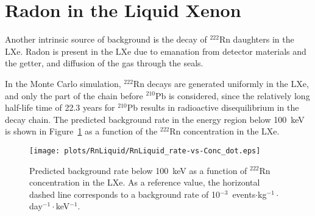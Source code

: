 \section{Radon in the Liquid Xenon}

Another intrinsic source of background is the decay of $^{222}$Rn daughters in the LXe. Radon is present in the LXe due to emanation from detector materials and the getter, and diffusion of the gas  through the seals. 

In the Monte Carlo simulation, $^{222}$Rn decays are generated uniformly in the LXe, and only the part of the chain before $^{210}$Pb is considered, since the relatively long half-life time of 22.3 years for $^{210}$Pb results in radioactive disequilibrium in the decay chain.
The predicted background rate in the energy region below 100~keV is shown in Figure~\ref{figLXeRn} as a function of the $^{222}$Rn concentration in the LXe.

\begin{figure}[!t]
\texttt{[image: plots/RnLiquid/RnLiquid\_rate-vs-Conc\_dot.eps]}
\caption[Predicted background rate below 100~keV as a function of $^{222}$Rn concentration in the LXe]{Predicted background rate below 100~keV as a function of $^{222}$Rn concentration in the LXe. As a reference value, the horizontal dashed line corresponds to a background rate of 10$^{-3}$~events$\cdot$kg$^{-1}\cdot$day$^{-1}\cdot$keV$^{-1}$. }
\label{figLXeRn}
\end{figure}
